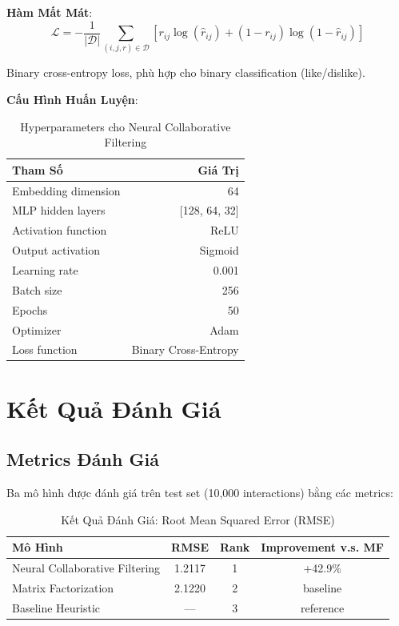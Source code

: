 \documentclass[12pt,a4paper]{article}
\begin{document}
\textbf{Hàm Mất Mát}:
\begin{equation}
\mathcal{L} = -\frac{1}{|\mathcal{D}|} \sum_{(i,j,r) \in \mathcal{D}} [r_{ij} \log(\hat{r}_{ij}) + (1-r_{ij}) \log(1-\hat{r}_{ij})]
\end{equation}

Binary cross-entropy loss, phù hợp cho binary classification (like/dislike).

\textbf{Cấu Hình Huấn Luyện}:

\begin{table}[H]
\centering
\begin{tabular}{|l|r|}
\hline
\textbf{Tham Số} & \textbf{Giá Trị} \\
\hline
Embedding dimension & 64 \\
MLP hidden layers & [128, 64, 32] \\
Activation function & ReLU \\
Output activation & Sigmoid \\
Learning rate & 0.001 \\
Batch size & 256 \\
Epochs & 50 \\
Optimizer & Adam \\
Loss function & Binary Cross-Entropy \\
\hline
\end{tabular}
\caption{Hyperparameters cho Neural Collaborative Filtering}
\end{table}

\section{Kết Quả Đánh Giá}

\subsection{Metrics Đánh Giá}

Ba mô hình được đánh giá trên test set (10,000 interactions) bằng các metrics:

\begin{table}[H]
\centering
\begin{tabular}{|l|c|c|c|}
\hline
\textbf{Mô Hình} & \textbf{RMSE} & \textbf{Rank} & \textbf{Improvement v.s. MF} \\
\hline
Neural Collaborative Filtering & 1.2117 & 1 & +42.9\% \\
Matrix Factorization & 2.1220 & 2 & baseline \\
Baseline Heuristic & — & 3 & reference \\
\hline
\end{tabular}
\caption{Kết Quả Đánh Giá: Root Mean Squared Error (RMSE)}
\end{table}
\end{document}
